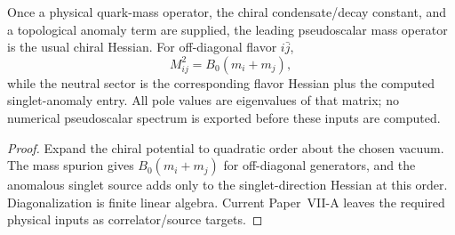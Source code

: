 \documentclass[12pt,a4paper]{article}
\begin{document}
\begin{corollary}
\label{p11:cor:explicit-leading-pseudoscalar-blocks}

Once a physical quark-mass operator, the chiral condensate/decay constant, and a topological anomaly term are supplied, the leading pseudoscalar mass operator is the usual chiral Hessian.  For off-diagonal flavor \(i\bar j\),
\[
M_{ij}^2=B_0(m_i+m_j),
\]
while the neutral sector is the corresponding flavor Hessian plus the computed singlet-anomaly entry.  All pole values are eigenvalues of that matrix; no numerical pseudoscalar spectrum is exported before these inputs are computed.
\label{p11:eq:explicit-pseudoscalar-octet-mass-map}
\label{p11:eq:native-pseudoscalar-spectrum-numerical}
\label{p11:eq:explicit-native-neutral-spectrum-summary}
\label{p11:eq:neutral-reclosure-coefficient}
\label{p11:eq:numerical-neutral-pseudoscalar-pole-readout}
\label{p11:eq:native-fks-y-factor}
\label{p11:eq:native-singlet-axial-renormalization}
\label{p11:eq:native-fks-eta-eta-prime-matrix}
\label{p11:eq:native-eta-eta-prime-closed-poles}
\label{p11:eq:explicit-soft-pion-scattering-block}
\end{corollary}
\begin{proof}

Expand the chiral potential to quadratic order about the chosen vacuum.  The mass spurion gives \(B_0(m_i+m_j)\) for off-diagonal generators, and the anomalous singlet source adds only to the singlet-direction Hessian at this order.  Diagonalization is finite linear algebra.  Current Paper~VII-A leaves the required physical inputs as correlator/source targets.
\end{proof}
\end{document}

